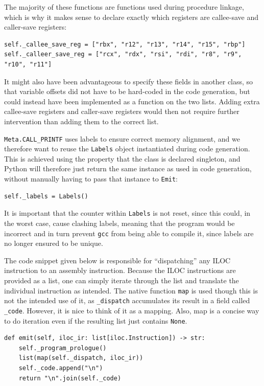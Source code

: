The majority of these functions are functions used during procedure linkage, which is why it makes sense to declare exactly which registers are callee-save and caller-save registers:

\begin{verbatim}
self._callee_save_reg = ["rbx", "r12", "r13", "r14", "r15", "rbp"]
self._calleer_save_reg = ["rcx", "rdx", "rsi", "rdi", "r8", "r9", "r10", "r11"]
\end{verbatim}

It might also have been advantageous to specify these fields in another class, so that variable offsets did not have to be hard-coded in the code generation, but could instead have been implemented as a function on the two lists. Adding extra callee-save registers and caller-save registers would then not require further intervention than adding them to the correct list.

\texttt{Meta.CALL\_PRINTF} uses labels to ensure correct memory alignment, and we therefore want to reuse the \texttt{Labels} object instantiated during code generation. This is achieved using the property that the class is declared singleton, and Python will therefore just return the same instance as used in code generation, without manually having to pass that instance to \texttt{Emit}:

\begin{verbatim}
self._labels = Labels()
\end{verbatim}

It is important that the counter within \texttt{Labels} is not reset, since this could, in the worst case, cause clashing labels, meaning that the program would be incorrect and in turn prevent \texttt{gcc} from being able to compile it, since labels are no longer ensured to be unique.

The code snippet given below is responsible for ``dispatching'' any ILOC instruction to an assembly instruction. Because the ILOC instructions are provided as a list, one can simply iterate through the list and translate the individual instruction as intended. The native function \texttt{map} is used though this is not the intended use of it, as \texttt{\_dispatch} accumulates its result in a field called \texttt{\_code}. However, it is nice to think of it as a mapping. Also, map is a concise way to do iteration even if the resulting list just contains \texttt{None}.

\begin{verbatim}
def emit(self, iloc_ir: list[iloc.Instruction]) -> str:
    self._program_prologue()
    list(map(self._dispatch, iloc_ir))
    self._code.append("\n")
    return "\n".join(self._code)
\end{verbatim}

